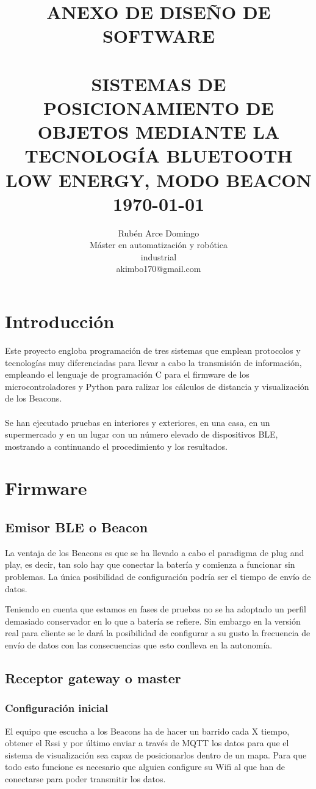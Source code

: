 \documentclass[paper=a4, fontsize=11pt,twoside]{scrartcl}
\title{	\normalsize \textsc{ANEXO DE DISEÑO DE SOFTWARE} 	%
		 	\\[2.0cm]								%
			\HRule{0.5pt} \\						%
			\LARGE \textbf{\uppercase{Sistemas de posicionamiento de objetos mediante la tecnología Bluetooth Low Energy, modo Beacon}}	%
			\HRule{2pt} \\ [0.5cm]		%
			\normalsize \today			%
		}
\author{
		Rubén Arce Domingo\\	
		Máster en automatización y robótica\\	
		industrial\\
		akimbo170@gmail.com\\
}
\makeatletter
\def\printtitle{%
    {\centering \@title\par}}
\def\printauthor{%
    {\centering \large \@author}}
\makeatother
\begin{document}
\thispagestyle{empty}		%
\printtitle					%
  	\vfill
\printauthor				%
\newpage
\cleardoublepage
\tableofcontents
\listoffigures
\cleardoublepage
\pagestyle{fancy}
\section{Introducción}
    Este proyecto engloba programación de tres sistemas que emplean protocolos y tecnologías muy diferenciadas para llevar a cabo 
    la transmisión de información, empleando el lenguaje de programación C para el firmware de los 
    microcontroladores y Python para ralizar los cálculos de distancia y visualización de los Beacons.
    \paragraph{}
    Se han ejecutado pruebas en interiores y exteriores, en una casa, en un supermercado y en un lugar con un número elevado 
    de dispositivos BLE, mostrando a continuando el procedimiento y los resultados.
\section{Firmware}
    \subsection{Emisor BLE o Beacon}
        La ventaja de los Beacons es que se ha llevado a cabo el paradigma de plug and play, es decir, tan solo hay que conectar la batería y comienza 
        a funcionar sin problemas. La única posibilidad de configuración podría ser el tiempo de envío de datos.
        
        Teniendo en cuenta que estamos en fases de pruebas no se ha adoptado un perfil demasiado conservador en lo que a batería se refiere. 
        Sin embargo en la versión real para cliente se le dará la posibilidad de configurar a su gusto la frecuencia de envío de datos con las consecuencias 
        que esto conlleva en la autonomía.
    \subsection{Receptor gateway o master}
        \subsubsection{Configuración inicial}
            El equipo que escucha a los Beacons ha de hacer un barrido cada X tiempo, obtener el Rssi y por último enviar a través de MQTT los datos 
            para que el sistema de visualización sea capaz de posicionarlos dentro de un mapa.
            Para que todo esto funcione es necesario que alguien configure su Wifi al que han de conectarse para poder transmitir los datos.
\end{document}
